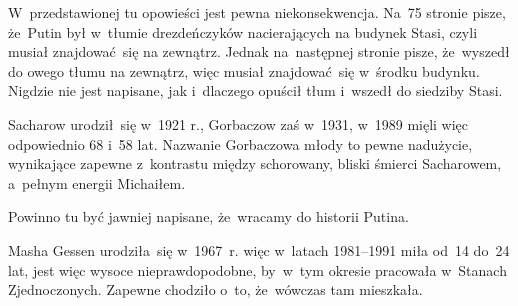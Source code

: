 \documentclass[a4paper,11pt]{article}
\begin{document}
\vspace{\spaceFour}


\start {} W~przedstawionej tu opowieści jest pewna
niekonsekwencja. Na~75 stronie pisze, że~Putin był w~tłumie
drezdeńczyków nacierających na budynek Stasi, czyli musiał
znajdować~się na zewnątrz. Jednak na~następnej stronie pisze,
że~wyszedł do owego tłumu na zewnątrz, więc musiał znajdować~się
w~środku budynku. Nigdzie nie jest napisane, jak i~dlaczego opuścił
tłum i~wszedł do siedziby Stasi.

\vspace{\spaceFour}


\start {} Sacharow urodził~się w~1921 r., Gorbaczow zaś w~1931,
w~1989 mięli więc odpowiednio 68 i~58 lat. Nazwanie Gorbaczowa młody
to pewne nadużycie, wynikające zapewne z~kontrastu między schorowany,
bliski śmierci Sacharowem, a~pełnym energii Michaiłem.

\vspace{\spaceFour}


\start {}  Powinno tu być jawniej napisane,
że~wracamy do historii Putina.

\vspace{\spaceFour}


\start {} Masha Gessen
urodziła~się w~1967~r. więc w~latach 1981--1991 miła od~14 do~24 lat,
jest więc wysoce nieprawdopodobne, by~w~tym okresie pracowała
w~Stanach Zjednoczonych. Zapewne chodziło o~to, że~wówczas tam
mieszkała.
\end{document}
